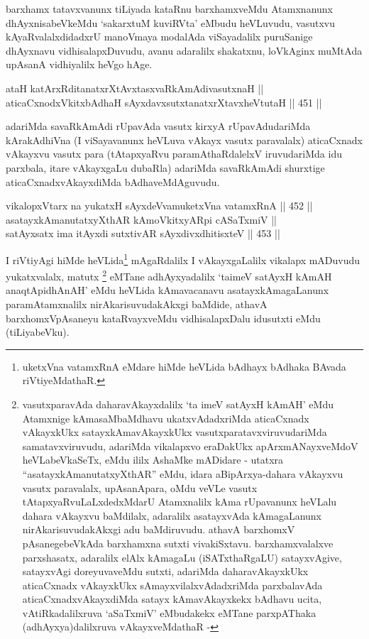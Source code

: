 \begin{artha}
barxhamx
tatavxvanunx tiLiyada kataRnu barxhamxveMdu
Atamxnanunx dhAyxnisabeVkeMdu `sakarxtuM kuviRVta' eMbudu heVLuvudu,
vasutxvu kAyaRvalalxdidadxrU manoVmaya modalAda viSayadalilx
puruSanige dhAyxnavu vidhisalapxDuvudu, avanu adaralilx shakatxnu,
loVkAginx muMtAda upAsanA vidhiyalilx heVgo hAge.
\end{artha}

\begin{shl}
ataH katArxRditanatxrXtAvxtasxvaRkAmAdivasutxnaH || \\
aticaCxnodxVkitxbAdhaH sAyxdavxsutxtanatxrXtavxheVtutaH \hfill || 451 ||  
\end{shl}

\begin{artha}
adariMda savaRkAmAdi rUpavAda vasutx kirxyA rUpavAdudariMda
kArakAdhiVna (I viSayavanunx heVLuva vAkayx vasutx paravalalx)
aticaCxnadx vAkayxvu vasutx para (tAtapxyaRvu paramAthaRdalelxV
iruvudariMda idu parxbala, itare vAkayxgaLu dubaRla) adariMda
savaRkAmAdi shurxtige aticaCxnadxvAkayxdiMda bAdhaveMdAguvudu.
\end{artha}


\begin{shl}
vikalopxV\s tarx na yukatxH sAyxdeVvamuketxVna vatamxRnA || 452 || \\
asatayxkAmanutatxyXthAR kAmoVkitxyAR\s pi cASaTxmiV || \\
satAyxsatx ima itAyxdi sutxtivAR sAyxdivxdhitisxteV \hfill || 453 ||  
\end{shl}

\begin{artha}
I riVtiyAgi hiMde heVLida\footnote{uketxVna vatamxRnA eMdare hiMde
heVLida bAdhayx bAdhaka BAvada riVtiyeMdathaR.} mAgaRdalilx I vAkayxgaLalilx
vikalapx mADuvudu yukatxvalalx, matutx \footnote{vasutxparavAda
daharavAkayxdalilx `ta imeV satAyxH kAmAH' eMdu Atamxnige
kAmasaMbaMdhavu ukatxvAdadxriMda aticaCxnadx vAkayxkUkx
satayxkAmavAkayxkUkx vasutxparatavxviruvudariMda samatavxviruvudu,
adariMda vikalapxvo eraDakUkx apArxmANayxveMdoV heVLabeVkaSeTx, eMdu
ililx AshaMke mADidare - utatxra ``asatayxkAmanutatxyXthAR'' eMdu,
idara aBipArxya-dahara vAkayxvu vasutx paravalalx, upAsanApara, oMdu
veVLe vasutx tAtapxyaRvuLaLxdedxMdarU Atamxnalilx kAma rUpavanunx
heVLalu dahara vAkayxvu baMdilalx, adaralilx asatayxvAda
kAmagaLanunx nirAkarisuvudakAkxgi adu baMdiruvudu. athavA barxhomxV
pAsanegebeVkAda barxhamxna sutxti vivakiSxtavu. barxhamxvalalxve
parxshasatx, adaralilx elAlx kAmagaLu (iSATxthaRgaLU) satayxvAgive,
satayxvAgi doreyuvaveMdu sutxti, adariMda daharavAkayxkUkx
aticaCxnadx vAkayxkUkx sAmayxvilalxvAdadxriMda parxbalavAda
aticaCxnadxvAkayxdiMda satayx kAmavAkayxkekx bAdhavu ucita,
vAtiRkadalilxruva `aSaTxmiV' eMbudakekx eMTane parxpAThaka
(adhAyxya)dalilxruva vAkayxveMdathaR -} eMTane
adhAyxyadalilx `taimeV satAyxH kAmAH anaqtApidhAnAH' eMdu heVLida
kAmavacanavu asatayxkAmagaLanunx paramAtamxnalilx nirAkarisuvudakAkxgi
baMdide, athavA barxhomxVpAsaneyu kataRvayxveMdu vidhisalapxDalu
idusutxti eMdu (tiLiyabeVku).
\end{artha}


